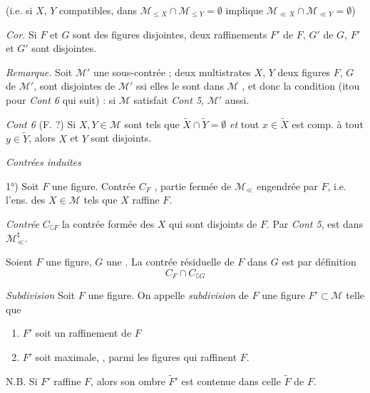 \documentclass[11pt,a4paper]{article}
\begin{document}
(i.e. si $X$, $Y$ compatibles, dans $\mathcal{M}_{\leq X} \cap \mathcal{M}_{\leq Y} = \emptyset$ implique $\mathcal{M}_{\ll X} \cap \mathcal{M}_{\ll Y} = \emptyset$)

\emph{Cor.} Si $F$ et $G$ sont des figures disjointes, deux raffinements $F'$ de $F$, $G'$ de $G$, $F'$ et $G'$ sont disjointes.

\emph{Remarque.} Soit $\mathcal{M}'$ une sous-contrée \ill{} ; deux multistrates $X$, $Y$ \struck{\ill{}} \ill{} deux figures $F$, $G$ de $\mathcal{M}'$, sont disjointes \ill{} de $\mathcal{M}'$ ssi elles le sont dans $\mathcal{M}$ \ill{}, et donc la condition \ill{} (itou pour \emph{Cont 6} qui suit) : si $\mathcal{M}$ satisfait \emph{Cont 5}, $\mathcal{M}'$ aussi.

\emph{Cont 6} (F.  ?) \quad Si $X, Y \in \mathcal{M}$ sont tels que \struck{$\forall$} $\widetilde{X} \cap \widetilde{Y} = \emptyset$ \emph{et} tout  $x \in \widetilde{X}$ est comp. à tout $y \in \widetilde{Y}$, alors $X$ et $Y$ sont disjoints.

\emph{Contrées induites}

1°) Soit $F$ une figure. Contrée $C_F$ ,   partie fermée de $\mathcal{M}_{\ll}$ engendrée par $F$, i.e. l'ens. des $X \in \mathcal{M}$ tels que $X$ raffine $F$.

\emph{Contrée } \quad $C_{\complement F}$ la contrée formée des $X$  qui sont disjoints de $F$. Par \emph{Cont 5}, \ill{} est \struck{\ill{}}  dans $\mathcal{M}^{\sharp}_{\ll}$.

 Soient $F$ une figure, $G$ une \ill{}.  La contrée résiduelle de $F$ dans $G$ est par définition
\[
  C_F \cap C_{\complement G}
\]

\emph{Subdivision} \quad Soit $F$  une figure. On appelle \emph{subdivision} de $F$ une figure $F' \subset \mathcal{M}$ telle que
\begin{enumerate}
  \item[a)] $F'$ soit un raffinement de $F$
  \item[b)] $F'$ soit maximale, , parmi les  figures qui raffinent $F$.
\end{enumerate}

N.B. Si $F'$ raffine $F$, alors son ombre $\widetilde{F}'$ est contenue dans celle $\widetilde{F}$ de $F$.

\end{document}
